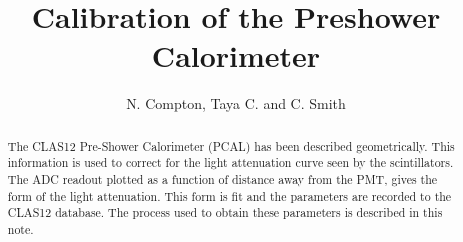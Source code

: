 \documentclass[letterpaper,10pt]{article}
\title{Calibration of the Preshower Calorimeter}
\author{N. Compton, Taya C. and C. Smith}
\begin{document}
\maketitle

\begin{abstract}
The CLAS12 Pre-Shower Calorimeter (PCAL) has been described geometrically. This information is used to correct 
for the light attenuation curve seen by the scintillators. The ADC readout plotted as a function of distance 
away from the PMT, gives the form of the light attenuation. This form is fit and the parameters are recorded 
to the CLAS12 database. The process used to obtain these parameters is described in this note.
\end{abstract} 


\tableofcontents
\clearpage



%














\end{document}
